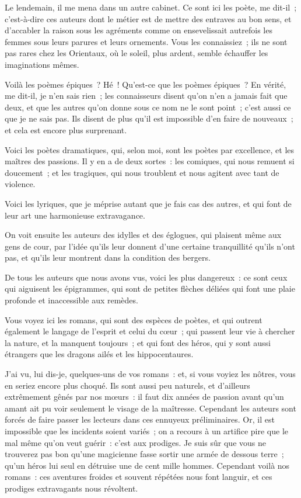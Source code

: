 \documentclass[french,twoside]{book} %
\begin{document}
\noindent Le lendemain, il me mena dans un autre cabinet. Ce sont ici les poète, me dit-il ; c’est-à-dire ces auteurs dont le métier est de mettre des entraves au bon sens, et d’accabler la raison sous les agréments comme on ensevelissait autrefois les femmes sous leurs parures et leurs ornements. Vous les connaissiez ; ils ne sont pas rares chez les Orientaux, où le soleil, plus ardent, semble échauffer les imaginations mêmes.\par
Voilà les poèmes épiques ? Hé ! Qu’est-ce que les poèmes épiques ? En vérité, me dit-il, je n’en sais rien ; les connaisseurs disent qu’on n’en a jamais fait que deux, et que les autres qu’on donne sous ce nom ne le sont point ; c’est aussi ce que je ne sais pas. Ils disent de plus qu’il est impossible d’en faire de nouveaux ; et cela est encore plus surprenant.\par
Voici les poètes dramatiques, qui, selon moi, sont les poètes par excellence, et les maîtres des passions. Il y en a de deux sortes : les comiques, qui nous remuent si doucement ; et les tragiques, qui nous troublent et nous agitent avec tant de violence.\par
Voici les lyriques, que je méprise autant que je fais cas des autres, et qui font de leur art une harmonieuse extravagance.\par
On voit ensuite les auteurs des idylles et des églogues, qui plaisent même aux gens de cour, par l’idée qu’ils leur donnent d’une certaine tranquillité qu’ils n’ont pas, et qu’ils leur montrent dans la condition des bergers.\par
De tous les auteurs que nous avons vus, voici les plus dangereux : ce sont ceux qui aiguisent les épigrammes, qui sont de petites flèches déliées qui font une plaie profonde et inaccessible aux remèdes.\par
Vous voyez ici les romans, qui sont des espèces de poètes, et qui outrent également le langage de l’esprit et celui du cœur ; qui passent leur vie à chercher la nature, et la manquent toujours ; et qui font des héros, qui y sont aussi étrangers que les dragons ailés et les hippocentaures.\par
J’ai vu, lui dis-je, quelques-uns de vos romans : et, si vous voyiez les nôtres, vous en seriez encore plus choqué. Ils sont aussi peu naturels, et d’ailleurs extrêmement gênés par nos mœurs : il faut dix années de passion avant qu’un amant ait pu voir seulement le visage de la maîtresse. Cependant les auteurs sont forcés de faire passer les lecteurs dans ces ennuyeux préliminaires. Or, il est impossible que les incidents soient variés ; on a recours à un artifice pire que le mal même qu’on veut guérir : c’est aux prodiges. Je suis sûr que vous ne trouverez pas bon qu’une magicienne fasse sortir une armée de dessous terre ; qu’un héros lui seul en détruise une de cent mille hommes. Cependant voilà nos romans : ces aventures froides et souvent répétées nous font languir, et ces prodiges extravagants nous révoltent.\par
\end{document}
